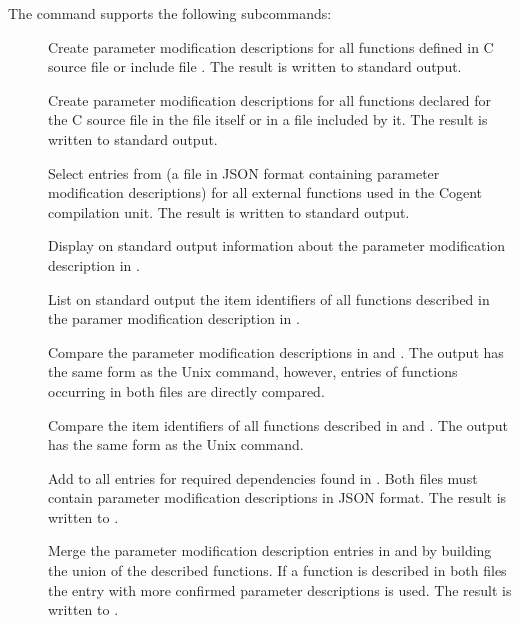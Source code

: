 The  command supports the following subcommands:
\begin{description}
\item[] Create parameter modification descriptions for all functions defined in C source file 
or include file .
The result is written to standard output.

\item[] Create parameter modification descriptions for all functions declared for the C source file
 in the file itself or in a file included by it.
The result is written to standard output.

\item[] Select entries from  (a file in JSON format containing parameter modification
descriptions) for all external functions used in the Cogent compilation unit. 
The result is written to standard output.

\item[] Display on standard output information about the parameter modification description in .

\item[] List on standard output the item identifiers of all functions described in the 
paramer modification description in .

\item[] Compare the parameter modification descriptions in  and . The output
has the same form as the Unix  command, however, entries of functions occurring in both files are 
directly compared.

\item[] Compare the item identifiers of all functions described in  and .
The output has the same form as the Unix  command.

\item[] Add to  all entries for required dependencies found in . Both files must contain 
parameter modification descriptions in JSON format. The result is written to .

\item[] Merge the parameter modification description entries in  and  by building 
the union of the described functions. If a function is described in both files the entry with more confirmed parameter 
descriptions is used. The result is written to .


\end{description}
